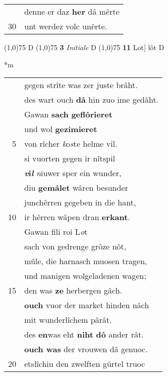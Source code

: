 \documentclass[8pt,a4paper,notitlepage]{article}
\begin{document}
\begin{table}[ht]
\begin{minipage}[t]{0.5\linewidth}
\begin{tabular}{rl}
 & denne er daz \textbf{her} dâ mêrte\\ 
30 & unt werdez volc unêrte.\\ 
\end{tabular}
\scriptsize
\line(1,0){75} \newline
D \newline
\line(1,0){75} \newline
\textbf{3} \textit{Initiale} D  \newline
\line(1,0){75} \newline
\textbf{11} Lot] lôt D \newline
\end{minipage}
\hspace{0.5cm}
\begin{minipage}[t]{0.5\linewidth}
\small
\begin{center}*m
\end{center}
\begin{tabular}{rl}
 & gegen strîte was zer juste brâht.\\ 
 & des wart ouch \textbf{dâ} hin zuo ime gedâht.\\ 
 & Gawan \textbf{sach} \textbf{geflôrieret}\\ 
 & und wol \textbf{gezimieret}\\ 
5 & von rîcher \textit{k}o\textit{s}te helme vil.\\ 
 & si vuorten gegen ir nîtspil\\ 
 & \textbf{\textit{v}i\textit{l}} \textit{n}iuwer sper ein wunder,\\ 
 & diu \textbf{gemâlet} wâren besunder\\ 
 & junchêrren gegeben in die hant,\\ 
10 & ir hêrren wâpen dran \textbf{erkant}.\\ 
 & Gawan fili roi L\textit{o}t\\ 
 & sach von gedrenge grôze nôt,\\ 
 & mûle, die harnasch muosen tragen,\\ 
 & und manigen wolgeladenen wagen;\\ 
15 & den was \textbf{ze} herbergen gâch.\\ 
 & \textbf{ouch} vuor der market hinden nâch\\ 
 & mit wunderlîchem pârât.\\ 
 & des \textbf{en}was eht \textbf{niht} \textbf{dô} ander rât.\\ 
 & \textbf{ouch was} der vrouwen dâ genuoc.\\ 
20 & etslîchiu den zwelften gürtel truoc\\ 

\end{tabular}
\end{minipage}
\end{table}
\end{document}
